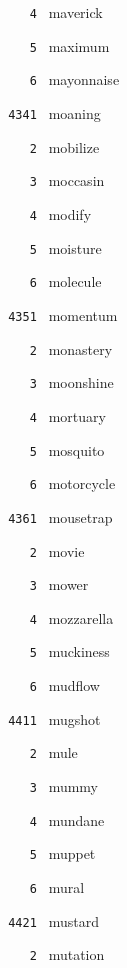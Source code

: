 \documentclass[11pt]{article}
\begin{document}
\begin{multicols}{6}
\noindent \texttt{ \ \ \ 4 } maverick  \par
\noindent \texttt{ \ \ \ 5 } maximum  \par
\noindent \texttt{ \ \ \ 6 } mayonnaise  \par
\vspace{3mm}
\noindent \texttt{ 4341 } moaning  \par
\noindent \texttt{ \ \ \ 2 } mobilize  \par
\noindent \texttt{ \ \ \ 3 } moccasin  \par
\noindent \texttt{ \ \ \ 4 } modify  \par
\noindent \texttt{ \ \ \ 5 } moisture  \par
\noindent \texttt{ \ \ \ 6 } molecule  \par
\vspace{3mm}
\noindent \texttt{ 4351 } momentum  \par
\noindent \texttt{ \ \ \ 2 } monastery  \par
\noindent \texttt{ \ \ \ 3 } moonshine  \par
\noindent \texttt{ \ \ \ 4 } mortuary  \par
\noindent \texttt{ \ \ \ 5 } mosquito  \par
\noindent \texttt{ \ \ \ 6 } motorcycle  \par
\vspace{3mm}
\noindent \texttt{ 4361 } mousetrap  \par
\noindent \texttt{ \ \ \ 2 } movie  \par
\noindent \texttt{ \ \ \ 3 } mower  \par
\noindent \texttt{ \ \ \ 4 } mozzarella  \par
\noindent \texttt{ \ \ \ 5 } muckiness  \par
\noindent \texttt{ \ \ \ 6 } mudflow  \par
\noindent \texttt{ 4411 } mugshot  \par
\noindent \texttt{ \ \ \ 2 } mule  \par
\noindent \texttt{ \ \ \ 3 } mummy  \par
\noindent \texttt{ \ \ \ 4 } mundane  \par
\noindent \texttt{ \ \ \ 5 } muppet  \par
\noindent \texttt{ \ \ \ 6 } mural  \par
\vspace{3mm}
\noindent \texttt{ 4421 } mustard  \par
\noindent \texttt{ \ \ \ 2 } mutation  \par

\end{multicols}
\end{document}

